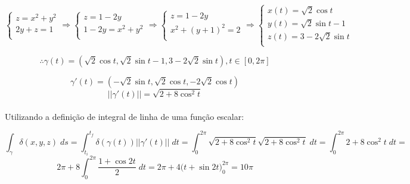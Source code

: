 \documentclass[12pt,a4paper]{article}
\begin{document}
$$
\begin{cases}
z = x^2 + y^2 \\
2y + z = 1 \\
\end{cases}
\Rightarrow
\begin{cases}
z = 1 - 2y\\
1 - 2y = x^2 + y^2 \\
\end{cases}
\Rightarrow
\begin{cases}
z = 1 - 2y\\
 x^2 + (y+1)^2 = 2 \\
\end{cases}
\Rightarrow
\begin{cases}
x(t) = \sqrt{2}\cos t \\
y(t) = \sqrt{2}\sin t -1\\
z(t) = 3 - 2\sqrt{2}\sin t \\
\end{cases}
$$

\begin{equation}
\therefore \gamma(t) = (\sqrt{2}\cos t, \sqrt{2}\sin t -1, 3 - 2\sqrt{2}\sin t), t \in [0,2\pi]
\label{Q3_parametrizacao}
\end{equation}

$$ \gamma'(t) = (-\sqrt{2}\sin t, \sqrt{2}\cos t , - 2\sqrt{2}\cos t) $$
$$ ||\gamma'(t)|| = \sqrt{2 + 8\cos^2 t} $$ \\

Utilizando a definiç\~{a}o de integral de linha de uma função escalar:

$$  \int_{\gamma}{\delta(x,y,z)}\;ds = \int_{t_i}^{t_f} {\delta(\gamma(t)) ||\gamma'(t) ||}\;dt = \int_{0}^{2\pi} {\sqrt{2 + 8\cos^2 t} \sqrt{2 + 8\cos^2 t}}\;dt = \int_{0}^{2\pi} {2 + 8\cos^2 t}\;dt =  $$
$$ 2\pi + 8\int_{0}^{2\pi} {\frac{1+\cos 2t}{2}}\;dt = 2\pi + 4 \Big( t + \sin 2t \Big)_0^{2\pi} = 10\pi $$
\end{document}
